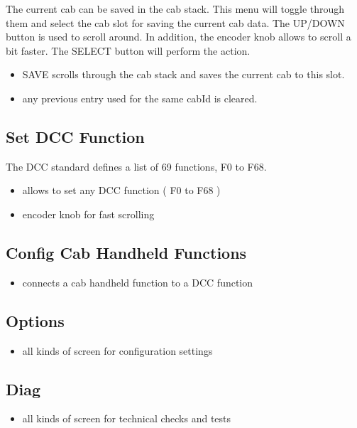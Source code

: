 The current cab can be saved in the cab stack. This menu will toggle through them and select the cab slot for saving the current cab data. The UP/DOWN button is used to scroll around. In addition, the encoder knob allows to scroll a bit faster. The SELECT button will perform the action.

\begin{itemize}
\item SAVE scrolls through the cab stack and saves the current cab to this slot.
\item any previous entry used for the same cabId is cleared.
\end{itemize}

\subsection{Set DCC Function}

The DCC standard defines a list of 69 functions, F0 to F68.

\begin{itemize}
\item allows to set any DCC function ( F0 to F68 )
\item encoder knob for fast scrolling
\end{itemize}

\subsection{Config Cab Handheld Functions}

\begin{itemize}
\item connects a cab handheld function to a DCC function
\end{itemize}

\subsection{Options}

\begin{itemize}
\item all kinds of screen for configuration settings
\end{itemize}

\subsection{Diag}

\begin{itemize}
\item all kinds of screen for technical checks and tests
\end{itemize}

